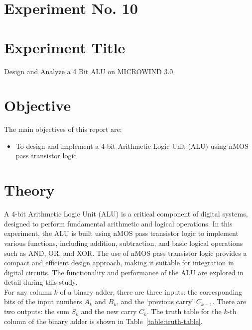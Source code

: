 \documentclass[a4paper,12pt]{article}
\begin{document}
	\section{Experiment No. 10}
	
	
	\section{Experiment Title }
	Design and Analyze a 4 Bit ALU on MICROWIND 3.0
	\section{Objective}
	The main objectives of this report are:
	\begin{itemize}
	\item 	To design and implement a 4-bit Arithmetic Logic Unit (ALU) using nMOS pass transistor logic
	
	\end{itemize}
	\section{Theory}
	
	A 4-bit Arithmetic Logic Unit (ALU) is a critical component of digital systems, designed to perform fundamental arithmetic and logical operations. In this experiment, the ALU is built using nMOS pass transistor logic to implement various functions, including addition, subtraction, and basic logical operations such as AND, OR, and XOR. The use of nMOS pass transistor logic provides a compact and efficient design approach, making it suitable for integration in digital circuits. The functionality and performance of the ALU are explored in detail during this study.\\
	For any column $k$ of a binary adder, there are three inputs: the corresponding bits of the input numbers $A_k$ and $B_k$, and the `previous carry' $C_{k-1}$. There are two outputs: the sum $S_k$ and the new carry $C_k$. The truth table for the $k$-th column of the binary adder is shown in Table~\ref{table:truth-table}.
	
\end{document}
